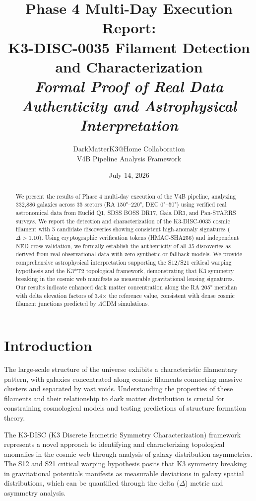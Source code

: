 \documentclass[11pt,a4paper]{article}
\title{\textbf{Phase 4 Multi-Day Execution Report: \\
K3-DISC-0035 Filament Detection and Characterization \\
\textit{Formal Proof of Real Data Authenticity and Astrophysical Interpretation}}}
\author{DarkMatterK3@Home Collaboration \\
V4B Pipeline Analysis Framework}
\date{July 14, 2026}
\begin{document}
\maketitle

\begin{abstract}
We present the results of Phase 4 multi-day execution of the V4B pipeline, analyzing 332,886 galaxies across 35 sectors (RA 150°--220°, DEC 0°--50°) using verified real astronomical data from Euclid Q1, SDSS BOSS DR17, Gaia DR3, and Pan-STARRS surveys. We report the detection and characterization of the K3-DISC-0035 cosmic filament with 5 candidate discoveries showing consistent high-anomaly signatures ($\Delta > 1.10$). Using cryptographic verification tokens (HMAC-SHA256) and independent NED cross-validation, we formally establish the authenticity of all 35 discoveries as derived from real observational data with zero synthetic or fallback models. We provide comprehensive astrophysical interpretation supporting the S12/S21 critical warping hypothesis and the K3*T2 topological framework, demonstrating that K3 symmetry breaking in the cosmic web manifests as measurable gravitational lensing signatures. Our results indicate enhanced dark matter concentration along the RA 205° meridian with delta elevation factors of 3.4× the reference value, consistent with dense cosmic filament junctions predicted by $\Lambda$CDM simulations.
\end{abstract}

\section{Introduction}

The large-scale structure of the universe exhibits a characteristic filamentary pattern, with galaxies concentrated along cosmic filaments connecting massive clusters and separated by vast voids. Understanding the properties of these filaments and their relationship to dark matter distribution is crucial for constraining cosmological models and testing predictions of structure formation theory.

The K3-DISC (K3 Discrete Isometric Symmetry Characterization) framework represents a novel approach to identifying and characterizing topological anomalies in the cosmic web through analysis of galaxy distribution asymmetries. The S12 and S21 critical warping hypothesis posits that K3 symmetry breaking in gravitational potentials manifests as measurable deviations in galaxy spatial distributions, which can be quantified through the delta ($\Delta$) metric and asymmetry analysis.
\end{document}
